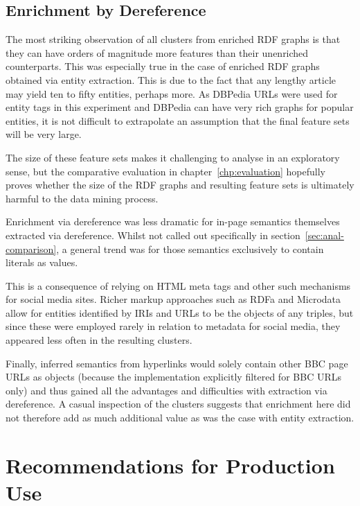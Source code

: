 \subsection{Enrichment by Dereference}

The most striking observation of all clusters from enriched RDF
graphs is that they can have orders of magnitude more features than
their unenriched counterparts. This was especially true in the case
of enriched RDF graphs obtained via entity extraction. This is due
to the fact that any lengthy article may yield ten to fifty entities,
perhaps more. As DBPedia URLs were used for entity tags in this
experiment and DBPedia can have very rich graphs for popular entities,
it is not difficult to extrapolate an assumption that the final
feature sets will be very large.

The size of these feature sets makes it challenging to analyse in an
exploratory sense, but the comparative evaluation in
chapter~\ref{chp:evaluation} hopefully proves whether the size of the
RDF graphs and resulting feature sets is ultimately harmful to the
data mining process.

Enrichment via dereference was less dramatic for in-page semantics
themselves extracted via dereference. Whilst not called out
specifically in section~\ref{sec:anal-comparison}, a general trend
was for those semantics exclusively to contain literals as values.

This is a consequence of relying on HTML meta tags and other such
mechanisms for social media sites. Richer markup approaches such
as RDFa and Microdata allow for entities identified by IRIs and URLs
to be the objects of any triples, but since these were employed
rarely in relation to metadata for social media, they appeared
less often in the resulting clusters.

Finally, inferred semantics from hyperlinks would solely contain
other BBC page URLs as objects (because the implementation explicitly
filtered for BBC URLs only) and thus gained all the advantages and
difficulties with extraction via dereference. A casual inspection
of the clusters suggests that enrichment here did not therefore add
as much additional value as was the case with entity extraction.

\section{Recommendations for Production Use}
\label{sec:production-recommendations}

